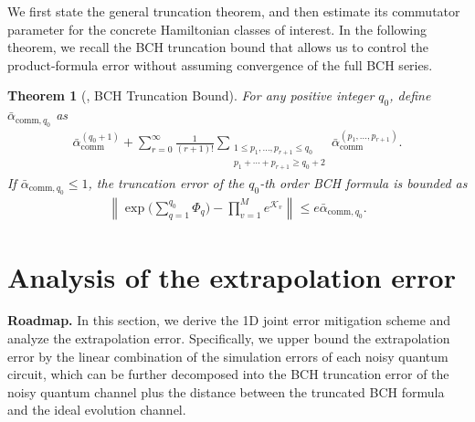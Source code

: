 \documentclass[aps,pra,reprint,groupedaddress,floatfix]{revtex4-2}
\newtheorem{theorem}{Theorem}
\renewcommand{\comm}{\mathrm{comm}}
\newcommand{\mc}{\mathcal}
\newcommand{\sz}[1]{{\color{blue} Shuo: #1}}
\begin{document}
We first state the general truncation theorem, and then estimate its commutator parameter for the concrete Hamiltonian classes of interest.
In the following theorem, we recall the BCH truncation bound that allows us to control the product-formula error without assuming convergence of the full BCH series.
\begin{theorem}[{\cite[Theorem~6]{wang2026lindbladiansimulationcommutatorbounds}}, BCH Truncation Bound]
 \label{thm:general-bch-truncation}
 For any positive integer $q_0$, define $\bar{\alpha}_{\comm,q_0}$ as
 \begin{align}
\label{eq:def-beta-comm-sum}
    \bar{\alpha}_{\comm}^{(q_0+1)}
    +
    \sum_{r = 0}^{\infty}\frac{1}{(r+1)!}
    \sum_{\substack{1\le p_1, \ldots, p_{r+1}\le q_0\\p_1+\cdots+p_{r+1} \ge q_0+2}}
    \bar{\alpha}_{\comm}^{(p_1, \ldots, p_{r+1})}.
\end{align}
 If $\bar{\alpha}_{\comm,q_0} \le 1$, the truncation error of the $q_0$-th order BCH formula is bounded as
 \begin{align*}
 \left\|\exp\Big(\sum_{q=1}^{q_0} \Phi_q\Big) - \prod_{v = 1}^Me^{\mc K_v} \right\| \le e\bar{\alpha}_{\comm,q_0}.
 \end{align*}
\end{theorem}


\section{Analysis of the extrapolation error}
\textbf{Roadmap.} In this section, we derive the 1D joint error mitigation scheme and analyze the extrapolation error. Specifically, we upper bound the extrapolation error by the linear combination of the simulation errors of each noisy quantum circuit, which can be further decomposed into the BCH truncation error of the noisy quantum channel plus the distance between the truncated BCH formula and the ideal evolution channel.
\end{document}
